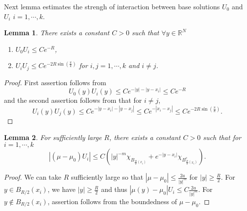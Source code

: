 \documentclass[a4paper,11pt]{article}
\newtheorem{lemma}{Lemma}[section]
\numberwithin{step}{dummy}
\begin{document}
Next lemma estimates the strengh of interaction between base solutions $U_0$ and $U_i$ $i=1,\cdots,k$.
\begin{lemma} \label{inter}There exists a constant $C>0$ such that $\forall y\in \mathbb{R}^N$
 \begin{enumerate} 
  \item $U_0U_i \le Ce^{-R}$,
  \item $U_iU_j \le Ce^{-2R\sin\left(\frac{\pi}{k}\right)}$ for $i,j=1,\cdots, k$ and $i\ne j$. 
 \end{enumerate}
\end{lemma}
\begin{proof}
 First assertion follows from
 $$U_0(y)U_i(y) \le Ce^{-|y|-|y-x_i|} \le Ce^{-R}$$
 and the second assertion follows from that for $i\ne j$,
 $$U_i(y)U_j(y) \le Ce^{-|y-x_i| - |y-x_j|}\le Ce^{-|x_i-x_j|} \le Ce^{-2R\sin\left(\frac{\pi}{k}\right)}.$$
\end{proof}
\begin{lemma} \label{p_inter} For sufficiently large $R$, there exists a constant $C>0$ such that for $i=1,\cdots,k$
$$|(\mu-\mu_0)U_i| \le C\left(|y|^{-m}\chi_{B_{\frac{R}{2}(x_i)}} + e^{-|y-x_i|}\chi_{B^c_{\frac{R}{2}(x_i)}}\right).$$
\end{lemma}
\begin{proof}
 We can take $R$ sufficiently large so that $|\mu-\mu_0| \le \frac{2a}{|y|^m}$ for $|y|\ge \frac{R}{2}$. For $y\in B_{R/2}(x_i)$, we have $|y|\ge \frac{R}{2}$ and thus $|\mu(y)-\mu_0|U_i \le C\frac{2a}{|y|^m}$. For $y\notin B_{R/2}(x_i)$, assertion follows from the boundedness of $\mu-\mu_0$.
\end{proof}
\end{document}
